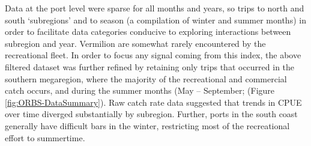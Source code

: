 \documentclass[11pt,
  english,
  a4paper,
]{article}
\begin{document}
\leavevmode\tagmcend\tagstructend


Data at the port level were sparse for all months and years, so trips to north and south `subregions' and to season (a compilation of winter and summer months) in order to facilitate data categories conducive to exploring interactions between subregion and year. Vermilion are somewhat rarely encountered by the recreational fleet. In order to focus any signal coming from this index, the above filtered dataset was further refined by retaining only trips that occurred in the southern megaregion, where the majority of the recreational and commercial catch occurs, and during the summer months (May -- September; (Figure \ref{fig:ORBS-DataSummary}). Raw catch rate data suggested that trends in CPUE over time diverged substantially by subregion. Further, ports in the south coast generally have difficult bars in the winter, restricting most of the recreational effort to summertime.

\leavevmode\tagmcend\tagstructend\par

\end{document}

